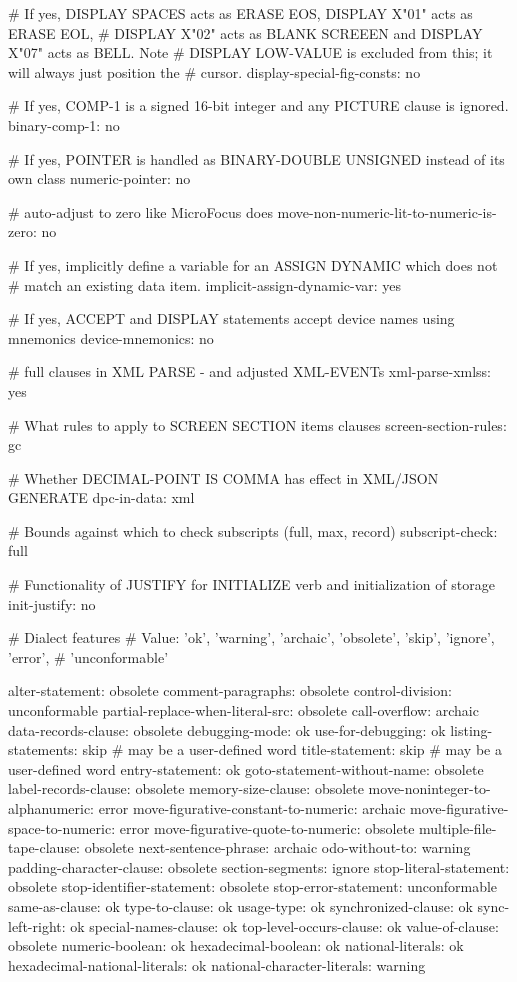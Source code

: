 # If yes, DISPLAY SPACES acts as ERASE EOS, DISPLAY X"01" acts as ERASE EOL,
# DISPLAY X"02" acts as BLANK SCREEEN and DISPLAY X"07" acts as BELL. Note
# DISPLAY LOW-VALUE is excluded from this; it will always just position the
# cursor.
display-special-fig-consts:	no

# If yes, COMP-1 is a signed 16-bit integer and any PICTURE clause is ignored.
binary-comp-1:			no

# If yes, POINTER is handled as BINARY-DOUBLE UNSIGNED instead of its own class
numeric-pointer:		no

# auto-adjust to zero like MicroFocus does
move-non-numeric-lit-to-numeric-is-zero: no

# If yes, implicitly define a variable for an ASSIGN DYNAMIC which does not
# match an existing data item.
implicit-assign-dynamic-var:	yes

# If yes, ACCEPT and DISPLAY statements accept device names using mnemonics
device-mnemonics:			no

# full clauses in XML PARSE - and adjusted XML-EVENTs
xml-parse-xmlss:		yes

# What rules to apply to SCREEN SECTION items clauses
screen-section-rules:		gc

# Whether DECIMAL-POINT IS COMMA has effect in XML/JSON GENERATE
dpc-in-data:			xml

# Bounds against which to check subscripts (full, max, record)
subscript-check:		full

# Functionality of JUSTIFY for INITIALIZE verb and initialization of storage
init-justify:		no

# Dialect features
# Value: 'ok', 'warning', 'archaic', 'obsolete', 'skip', 'ignore', 'error',
#        'unconformable'

alter-statement:			obsolete
comment-paragraphs:			obsolete
control-division:			unconformable
partial-replace-when-literal-src:	obsolete
call-overflow:				archaic
data-records-clause:			obsolete
debugging-mode:				ok
use-for-debugging:			ok
listing-statements:			skip	# may be a user-defined word
title-statement:			skip	# may be a user-defined word
entry-statement:			ok
goto-statement-without-name:		obsolete
label-records-clause:			obsolete
memory-size-clause:			obsolete
move-noninteger-to-alphanumeric:	error
move-figurative-constant-to-numeric:	archaic
move-figurative-space-to-numeric:	error
move-figurative-quote-to-numeric:	obsolete
multiple-file-tape-clause:		obsolete
next-sentence-phrase:			archaic
odo-without-to:				warning
padding-character-clause:		obsolete
section-segments:			ignore
stop-literal-statement:			obsolete
stop-identifier-statement:		obsolete
stop-error-statement:			unconformable
same-as-clause:				ok
type-to-clause:				ok
usage-type:					ok
synchronized-clause:			ok
sync-left-right:			ok	
special-names-clause:			ok
top-level-occurs-clause:		ok
value-of-clause:			obsolete
numeric-boolean:			ok
hexadecimal-boolean:			ok
national-literals:			ok
hexadecimal-national-literals:		ok
national-character-literals:		warning

